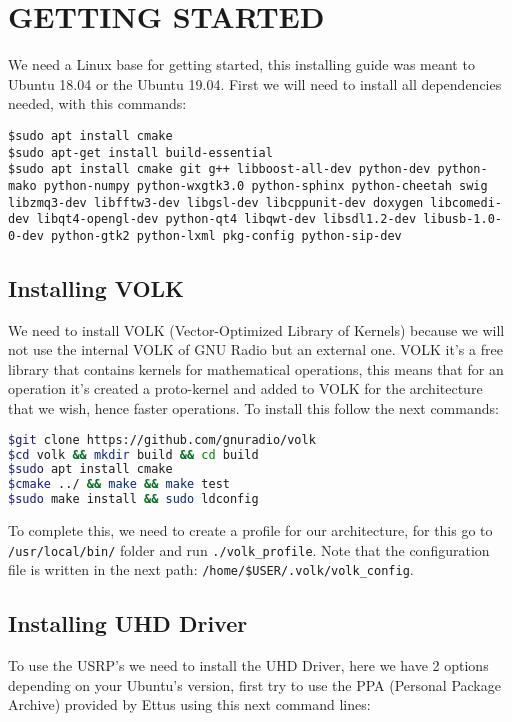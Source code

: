 \documentclass[a4paper, 10pt, conference]{ieeeconf}      %
\begin{document}
\section{GETTING STARTED}
We need a Linux base for getting started, this installing guide was meant to Ubuntu 18.04 or the Ubuntu 19.04. First we will need to install all dependencies needed, with this commands:

\begin{lstlisting}[breaklines]
$sudo apt install cmake
$sudo apt-get install build-essential
$sudo apt install cmake git g++ libboost-all-dev python-dev python-mako python-numpy python-wxgtk3.0 python-sphinx python-cheetah swig libzmq3-dev libfftw3-dev libgsl-dev libcppunit-dev doxygen libcomedi-dev libqt4-opengl-dev python-qt4 libqwt-dev libsdl1.2-dev libusb-1.0-0-dev python-gtk2 python-lxml pkg-config python-sip-dev
\end{lstlisting}

\subsection{Installing VOLK}
We need to install VOLK (Vector-Optimized Library of Kernels) because we will not use the internal VOLK of GNU Radio but an external one. VOLK it's a free library that contains kernels for mathematical operations, this means that for an operation it's created a proto-kernel and added to VOLK for the architecture that we wish, hence faster operations. To install this follow the next commands:

\begin{lstlisting}[language=bash, breaklines]
$git clone https://github.com/gnuradio/volk
$cd volk && mkdir build && cd build
$sudo apt install cmake
$cmake ../ && make && make test
$sudo make install && sudo ldconfig
\end{lstlisting}

To complete this, we need to create a profile for our architecture, for this go to \verb|/usr/local/bin/| folder and run \verb|./volk_profile|. Note that the configuration file is written in the next path: \verb|/home/$USER/.volk/volk_config|.


\subsection{Installing UHD Driver}
To use the USRP's we need to install the UHD Driver, here we have 2 options depending on your Ubuntu's version, first try to use the PPA (Personal Package Archive) provided by Ettus using this next command lines:
\end{document}

